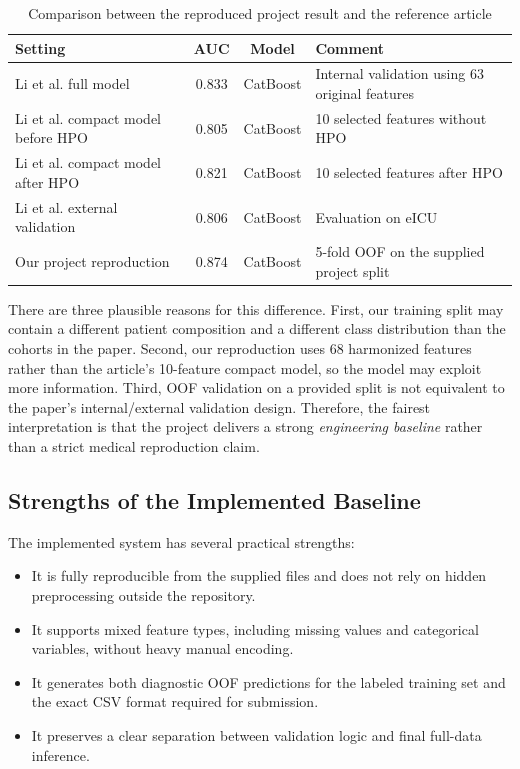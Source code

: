 \documentclass[a4paper,12pt]{extreport}
\begin{document}
\begin{table}[H]
    \centering
    \caption{Comparison between the reproduced project result and the reference article}
    \label{tab:paper_compare}
    \begin{tabularx}{\textwidth}{lccX}
        \toprule
        \textbf{Setting} & \textbf{AUC} & \textbf{Model} & \textbf{Comment} \\
        \midrule
        Li et al. full model \cite{li2022prediction} & 0.833 & CatBoost & Internal validation using 63 original features \\
        Li et al. compact model before HPO \cite{li2022prediction} & 0.805 & CatBoost & 10 selected features without HPO \\
        Li et al. compact model after HPO \cite{li2022prediction} & 0.821 & CatBoost & 10 selected features after HPO \\
        Li et al. external validation \cite{li2022prediction} & 0.806 & CatBoost & Evaluation on eICU \\
        Our project reproduction & 0.874 & CatBoost & 5-fold OOF on the supplied project split \\
        \bottomrule
    \end{tabularx}
\end{table}

There are three plausible reasons for this difference. First, our training split may contain a different patient composition and a different class distribution than the cohorts in the paper. Second, our reproduction uses 68 harmonized features rather than the article's 10-feature compact model, so the model may exploit more information. Third, OOF validation on a provided split is not equivalent to the paper's internal/external validation design. Therefore, the fairest interpretation is that the project delivers a strong \textit{engineering baseline} rather than a strict medical reproduction claim.

\subsection{Strengths of the Implemented Baseline}
The implemented system has several practical strengths:
\begin{itemize}[leftmargin=1.5em]
    \item It is fully reproducible from the supplied files and does not rely on hidden preprocessing outside the repository.
    \item It supports mixed feature types, including missing values and categorical variables, without heavy manual encoding.
    \item It generates both diagnostic OOF predictions for the labeled training set and the exact CSV format required for submission.
    \item It preserves a clear separation between validation logic and final full-data inference.
\end{itemize}
\end{document}
